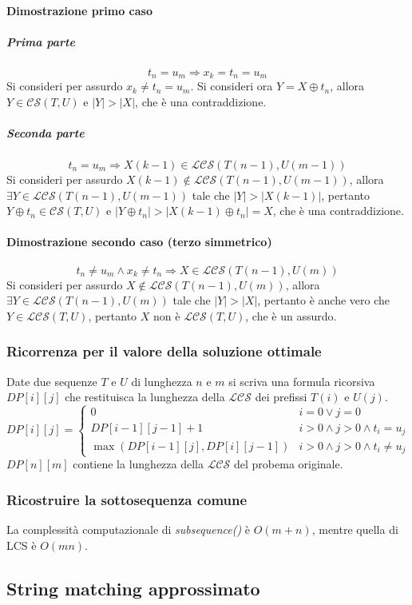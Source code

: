 \paragraph{Dimostrazione primo caso}
\subparagraph{Prima parte}
$$t_n = u_m \Rightarrow x_k = t_n = u_m$$
Si consideri per assurdo $x_k \neq t_n = u_m$. Si consideri ora $Y= X\oplus t_n$, allora $Y\in\mathcal{CS}(T, U)$ e $|Y|>|X|$, che \`e una contraddizione.
\subparagraph{Seconda parte}
$$t_n = u_m \Rightarrow X(k-1)\in\mathcal{LCS}(T(n-1), U(m-1))$$
Si consideri per assurdo $X(k-1)\not\in\mathcal{LCS}(T(n-1), U(m-1))$, allora $\exists Y\in\mathcal{LCS}(T(n-1), U(m-1))$ tale che $|Y|>|X(k-1)|$, pertanto
$Y\oplus t_n\in\mathcal{CS}(T, U)$ e $|Y\oplus t_n|>|X(k-1)\oplus t_n|=X$, che \`e una contraddizione. 
\paragraph{Dimostrazione secondo caso (terzo simmetrico)}
$$t_n\neq u_m\land x_k\neq t_n \Rightarrow X\in \mathcal{LCS}(T(n-1), U(m))$$
Si consideri per assurdo $X\not\in \mathcal{LCS}(T(n-1), U(m))$, allora $\exists Y\in\mathcal{LCS}(T(n-1), U(m))$ tale che $|Y|>|X|$, pertanto \`e anche
vero che $Y\in \mathcal{LCS}(T, U)$, pertanto $X$ non \`e $\mathcal{LCS}(T, U)$, che \`e un assurdo. 
\subsubsection{Ricorrenza per il valore della soluzione ottimale}
Date due sequenze $T$ e $U$ di lunghezza $n$ e $m$ si scriva una formula ricorsiva $DP[i][j]$ che restituisca la lunghezza della $\mathcal{LCS}$ dei 
prefissi $T(i)$ e $U(j)$.
$$
DP[i][j] = 
\begin{cases}
0 & i = 0\lor j = 0\\
DP[i-1][j-1]+1 & i > 0 \land j > 0 \land t_i = u_j\\
\max(DP[i - 1][j], DP[i][j - 1]) & i > 0 \land j > 0 \land t_i \neq u_j
\end{cases}
$$ 
$DP[n][m]$ contiene la lunghezza della $\mathcal{LCS}$ del probema originale. \\

\subsubsection{Ricostruire la sottosequenza comune}

La complessit\`a computazionale di \emph{subsequence()} \`e $O(m+n)$, mentre quella di LCS \`e $O(mn)$. 
\subsection{String matching approssimato}
